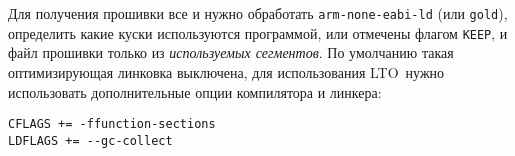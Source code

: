 
Для получения прошивки все  и  нужно
обработать  \verb|arm-none-eabi-ld| (или \verb|gold|), определить
какие куски используются программой, или отмечены флагом \verb|KEEP|, и
 файл прошивки только из \emph{используемых сегментов}.
По умолчанию такая оптимизирующая линковка выключена, для использования LTO\ нужно
использовать дополнительные опции компилятора и линкера:
\begin{lstlisting}
CFLAGS += -ffunction-sections
LDFLAGS += --gc-collect
\end{lstlisting}




\secup
